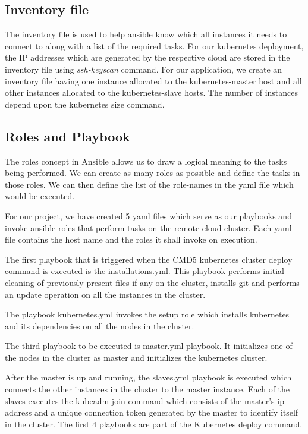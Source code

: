 \documentclass[9pt,twocolumn,twoside]{../../styles/osajnl}
\begin{document}
{\subsection{Inventory file}
The inventory file is used to help ansible know which all instances it
needs to connect to along with a list of the required tasks. For our
kubernetes deployment, the IP addresses which are generated by the
respective cloud are stored in the inventory file using
\emph{ssh-keyscan} command. For our application, we create an
inventory file having one instance allocated to the kubernetes-master
host and all other instances allocated to the kubernetes-slave
hosts. The number of instances depend upon the kubernetes size
command.

\subsection{Roles and Playbook}
The roles concept in Ansible allows us to draw a logical meaning to the
tasks being performed. We can create as many roles as possible and
define the tasks in those roles. We can then define the list of the
role-names in the yaml file which would be executed.\newline

\noindent
For our project, we have created 5 yaml files which serve as our
playbooks and invoke ansible roles that perform tasks on the remote
cloud cluster. Each yaml file contains the host name and the roles it
shall invoke on execution.\newline

\noindent
The first playbook that is triggered when the CMD5 kubernetes cluster
deploy command is executed is the installations.yml. This playbook
performs initial cleaning of previously present files if any on the
cluster, installs git and performs an update operation on all the
instances in the cluster.\newline

\noindent
The playbook kubernetes.yml invokes the setup role which installs
kubernetes and its dependencies on all the nodes in the
cluster. \newline

\noindent
The third playbook to be executed is master.yml playbook. It
initializes one of the nodes in the cluster as master and initializes
the kubernetes cluster.\newline

\noindent
After the master is up and running, the slaves.yml playbook is
executed which connects the other instances in the cluster to the
master instance. Each of the slaves executes the kubeadm join command
which consists of the master's ip address and a unique connection
token generated by the master to identify itself in the cluster. The
first 4 playbooks are part of the Kubernetes deploy command.\newline

}
\end{document}
